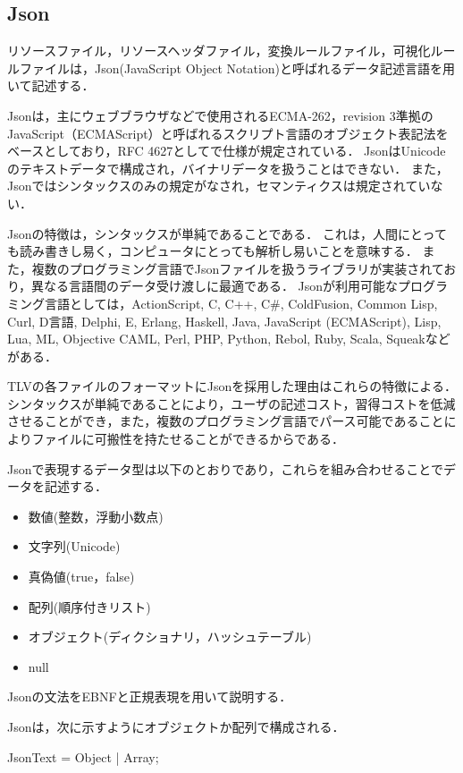 \subsection{Json}

リソースファイル，リソースヘッダファイル，変換ルールファイル，可視化ルールファイルは，Json(JavaScript Object Notation)\cite{Json}と呼ばれるデータ記述言語を用いて記述する．

Jsonは，主にウェブブラウザなどで使用されるECMA-262，revision 3準拠のJavaScript（ECMAScript）と呼ばれるスクリプト言語のオブジェクト表記法をベースとしており，RFC 4627としてで仕様が規定されている．
JsonはUnicodeのテキストデータで構成され，バイナリデータを扱うことはできない．
また，Jsonではシンタックスのみの規定がなされ，セマンティクスは規定されていない．

Jsonの特徴は，シンタックスが単純であることである．
これは，人間にとっても読み書きし易く，コンピュータにとっても解析し易いことを意味する．
また，複数のプログラミング言語でJsonファイルを扱うライブラリが実装されており，異なる言語間のデータ受け渡しに最適である．
Jsonが利用可能なプログラミング言語としては，ActionScript, C, C++, C\#, ColdFusion, Common Lisp, Curl, D言語, Delphi, E, Erlang, Haskell, Java, JavaScript (ECMAScript), Lisp, Lua, ML, Objective CAML, Perl, PHP, Python, Rebol, Ruby, Scala, Squeakなどがある．

TLVの各ファイルのフォーマットにJsonを採用した理由はこれらの特徴による．
シンタックスが単純であることにより，ユーザの記述コスト，習得コストを低減させることができ，また，複数のプログラミング言語でパース可能であることによりファイルに可搬性を持たせることができるからである．

Jsonで表現するデータ型は以下のとおりであり，これらを組み合わせることでデータを記述する．
\begin{itemize}
\setlength{\itemsep}{0.5\itemsep}
\item 数値(整数，浮動小数点)
\item 文字列(Unicode)
\item 真偽値(true，false)
\item 配列(順序付きリスト)
\item オブジェクト(ディクショナリ，ハッシュテーブル)
\item null
\end{itemize}

Jsonの文法をEBNFと正規表現を用いて説明する．

Jsonは，次に示すようにオブジェクトか配列で構成される．

\begin{EBNF}
JsonText = Object | Array;
\end{EBNF}

